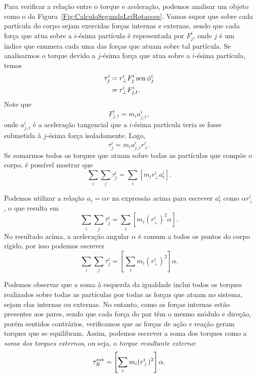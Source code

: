 Para verificar a relação entre o torque e aceleração, podemos analisar um objeto como o da Figura~\ref{Fig:CalculoSegundaLeiRotacoes}. Vamos supor que sobre cada partícula do corpo sejam exercidas forças internas e externas, sendo que cada força que atua sobre a $i$-ésima partícula é representada por $F_j^i$, onde $j$ é um índice que enumera cada uma das forças que atuam sobre tal partícula. Se analisarmos o torque devido a $j$-ésima força que atua sobre a $i$-ésima partícula, temos
\begin{align}
	\tau_j^i &= r_\perp^i F_j^i \operatorname{sen}\phi_j^i \\
	&= r_\perp^i F_{j,t}^i.
\end{align}
%
Note que
\begin{equation}
	F_{j,t}^{i} = m_i a_{j,t}^{i},
\end{equation}
%
onde $a_{j,t}^i$ é a aceleração tangencial que a $i$-ésima partícula teria se fosse submetida à $j$-ésima força isoladamente.
%
Logo,
\begin{equation}
	\tau_j^i = m_i a_{j,t}^{i} r_\perp^i.
\end{equation}
%
Se somarmos todos os torques que atuam sobre todas as partículas que compõe o corpo, é possível mostrar que
\begin{equation}
	\sum_i \sum_j \tau_j^i = \sum_{i}[m_i r_\perp^i a_{t}^i].
\end{equation}

Podemos utilizar a relação $a_t = \alpha r$ na expressão acima para escrever $a_{t}^i$ como $\alpha r_\perp^i$, o que resulta em
\begin{equation}
	\sum_i \sum_j \tau_j^i = \sum_{i}[m_i (r_\perp^i)^2 \alpha].
\end{equation}
%
No resultado acima, a aceleração angular $\alpha$ é comum a todos os pontos do corpo rígido, por isso podemos escrever
\begin{equation}
	\sum_i \sum_j \tau_j^i =  \left[\sum_{i} m_i (r_\perp^i)^2\right] \alpha.
\end{equation}

Podemos observar que a soma à esquerda da igualdade inclui todos os torques realizados sobre todas as partículas por todas as forças que atuam no sistema, sejam elas internas ou externas. No entanto, como as forças internas estão presentes aos pares, sendo que cada força do par têm o mesmo módulo e direção, porém sentidos contrários, verificamos que as forças de ação e reação geram torques que se equilibram. Assim, podemos escrever a soma dos torques como a \emph{soma dos torques externos}, ou seja, o \emph{torque resultante externo}:
\begin{equation}\label{Eq:ProtoSegundaLeiRotacoes}
    \tau_R^{\rm{ext}} = \left[\sum_{i} m_i (r_\perp^i)^2\right] \alpha.
\end{equation}
% 

